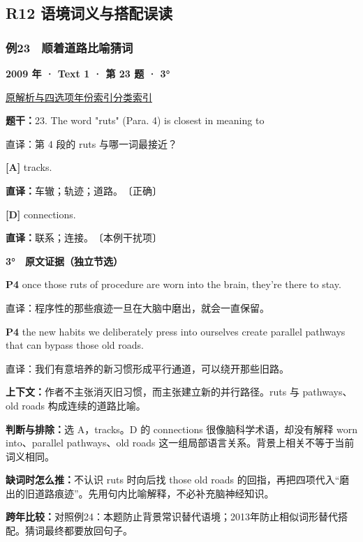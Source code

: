\documentclass[11pt,a4paper]{article}
\begin{document}
\subsection{R12 语境词义与搭配误读}
\subsubsection{例23　顺着道路比喻猜词}\label{case-2009-T1-Q23}
\noindent\textbf{2009 年 · Text 1 · 第 23 题 · 3°}\par\noindent \href{https://zj139.github.io/math-notes/english/67d0fd0739843c9aede29847/\#q23}{原解析与四选项}\quad \hyperref[idx-2009-T1-Q23]{年份索引}\quad \hyperref[class-R12]{分类索引}\par\smallskip
\noindent\textbf{题干：}23. The word "ruts" (Para. 4) is closest in meaning to\par
直译：第 4 段的 ruts 与哪一词最接近？\par
{}\noindent\textbf{[A]} tracks.\par\nopagebreak
\noindent\textbf{直译：}车辙；轨迹；道路。　〔正确〕\par
{}\noindent\textbf{[D]} connections.\par\nopagebreak
\noindent\textbf{直译：}联系；连接。　〔本例干扰项〕\par
\begin{evidence}\textbf{3°　原文证据（独立节选）}\par
\textbf{P4} once those ruts of procedure are worn into the brain, they're there to stay.\par 直译：程序性的那些痕迹一旦在大脑中磨出，就会一直保留。\par
\textbf{P4} the new habits we deliberately press into ourselves create parallel pathways that can bypass those old roads.\par 直译：我们有意培养的新习惯形成平行通道，可以绕开那些旧路。\par
\end{evidence}
\noindent\textbf{上下文：}作者不主张消灭旧习惯，而主张建立新的并行路径。ruts 与 pathways、old roads 构成连续的道路比喻。\par
\noindent\textbf{判断与排除：}选 A，tracks。D 的 connections 很像脑科学术语，却没有解释 worn into、parallel pathways、old roads 这一组局部语言关系。背景上相关不等于当前词义相同。\par
\noindent\textbf{缺词时怎么推：}不认识 ruts 时向后找 those old roads 的回指，再把四项代入“磨出的旧道路痕迹”。先用句内比喻解释，不必补充脑神经知识。\par
\noindent\textbf{跨年比较：}对照例24：本题防止背景常识替代语境；2013年防止相似词形替代搭配。猜词最终都要放回句子。\par
\clearpage
\end{document}
